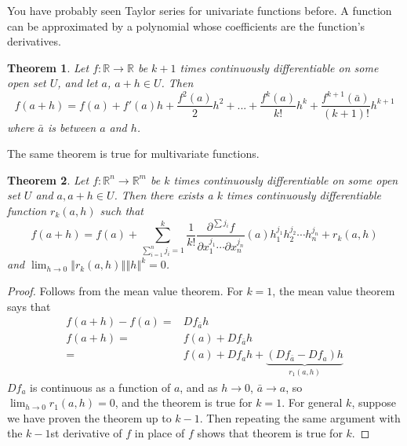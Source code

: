 \documentclass[12pt,reqno]{amsart}
\newtheorem{theorem}{Theorem}[section]
\theoremstyle{definition}
\def\R{\mathbb{R}}
\newcommand{\norm}[1]{\left\Vert {#1} \right\Vert}
\renewcommand{\to}{{\rightarrow}}
\begin{document}
You have probably seen Taylor series for univariate functions
before. A function can be approximated by a polynomial whose
coefficients are the function's derivatives. 
\begin{theorem}
  Let $f: \R \to \R$ be $k+1$ times continuously differentiable on some
  open set $U$, and let $a$, $a+h \in U$. Then 
  \[ f(a+h) = f(a) + f'(a) h + \frac{f^2(a)}{2} h^2 + ... +
  \frac{f^k(a)}{k!} h^k + \frac{f^{k+1}(\bar{a})}{(k+1)!} h^{k+1}
  \]
  where $\bar{a}$ is between $a$ and $h$. 
\end{theorem}
The same theorem is true for multivariate functions.
\begin{theorem}
  Let $f:\R^n \to \R^m$ be $k$ times continuously differentiable on
  some open set $U$ and $a, a+h \in U$. Then there exists a $k$ times
  continuously differentiable function $r_k(a,h)$ such that
  \[ f(a+h) = f(a) + \sum_{\sum_{i=1}^n {j_i}=1}^k\frac{1}{k!}
  \frac{\partial^{\sum j_i} f}{\partial x_{1}^{j_1} \cdots \partial
    x_{n}^{j_n}}(a) h_1^{j_1}h_2^{j_2} \cdots h_n^{j_n} + r_k(a,h) \]
  and $\lim_{h \to 0} \norm{r_k(a,h)}{\norm{h}^k} = 0$.
\end{theorem}
\begin{proof}
  Follows from the mean value theorem. For $k=1$, the mean value
  theorem says that
  \begin{align*}
    f(a+h) - f(a) = & Df_{\bar{a}} h \\
    f(a+h) = & f(a) + Df_{\bar{a}} h \\
    = & f(a) + Df_{a} h + \underbrace{(Df_{\bar{a}} -Df_a)h}_{r_1(a,h)}  
  \end{align*}
  $Df_a$ is continuous as a function of $a$, and as $h \to 0$,
  $\bar{a} \to a$, so $\lim_{h \to 0} r_1(a,h) = 0$, and the theorem
  is true for $k = 1$. For general $k$, suppose we have proven the
  theorem up to $k-1$. Then repeating the same argument with the
  $k-1$st derivative of $f$ in place of $f$ shows that theorem is true
  for $k$. 
\end{proof}
\end{document}
